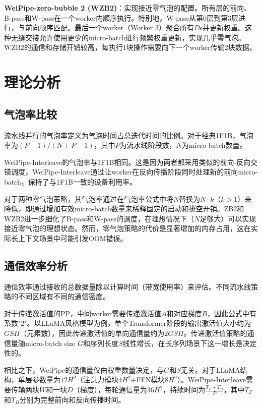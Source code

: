 \textbf{WeiPipe-zero-bubble 2 (WZB2)}：实现接近零气泡的配置。所有层的前向、B-pass和W-pass在一个worker内顺序执行。特别地，W-pass从第0层到第3层进行，与前向顺序匹配。最后一个worker（Worker 3）聚合所有$D$s并更新权重。这种无缝交接允许使用更少的micro-batch进行频繁权重更新，实现几乎零气泡。WZB2的通信和存储开销较高，每执行1块操作需要向下一个worker传输2块数据。

\section{理论分析}

\subsection{气泡率比较}

流水线并行的气泡率定义为气泡时间占总迭代时间的比例。对于经典1F1B，气泡率为$(P-1)/(N+P-1)$，其中$P$为流水线阶段数，$N$为micro-batch数量。

WeiPipe-Interleave的气泡率与1F1B相同。这是因为两者都采用类似的前向-反向交错调度，WeiPipe-Interleave通过让worker在反向传播阶段同时处理新的前向micro-batch，保持了与1F1B一致的设备利用率。

对于两种零气泡策略，其气泡率通过在气泡率公式中将$N$替换为$N \cdot k$（$k>1$）来降低，即通过增加有效micro-batch数量来稀释固定的启动和排空开销。ZB2和WZB2进一步细化了B-pass和W-pass的调度，在理想情况下（$N$足够大）可以实现接近零气泡的理想状态。然而，零气泡策略的代价是显著增加的内存占用，这在实际长上下文场景中可能引发OOM错误。

\subsection{通信效率分析}

通信效率通过接收的总数据量除以计算时间（带宽使用率）来评估。不同流水线策略的不同区域有不同的通信密度。

对于传递激活值的PP，中间worker需要传递激活值$A$和对应梯度$B$，因此公式中有系数"2"。以LLaMA风格模型为例，单个Transformer阶段的输出激活值大小约为$GSH$（元素数），因此传递激活值的单向通信量约为$2GSH$。传递激活值策略的通信量随micro-batch size $G$和序列长度$S$线性增长，在长序列场景下这一增长是决定性的。

相比之下，WeiPipe的通信量仅由权重数量决定，与$G$和$S$无关。对于LLaMA结构，单层参数量为$12H^2$（注意力模块$4H^2$+FFN模块$8H^2$）。WeiPipe-Interleave需要传输两块$W$和一块$D$（梯度），每轮通信量为$36H^2$，持续时间为$\frac{T_F + T_B}{P}$，其中$T_F$和$T_B$分别为完整前向和反向传播时间。

